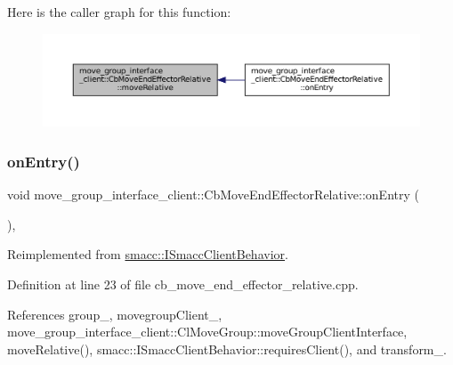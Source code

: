 Here is the caller graph for this function\+:
\nopagebreak
\begin{figure}[H]
\begin{center}
\leavevmode
\includegraphics[width=350pt]{classmove__group__interface__client_1_1CbMoveEndEffectorRelative_a8f64d14c4a398b455b1953ae61cc58bc_icgraph}
\end{center}
\end{figure}
\mbox{\label{classmove__group__interface__client_1_1CbMoveEndEffectorRelative_a54ba18388e200b43fda82a5f438d677e}} 
\subsubsection{\texorpdfstring{on\+Entry()}{onEntry()}}
{\footnotesize\ttfamily void move\+\_\+group\+\_\+interface\+\_\+client\+::\+Cb\+Move\+End\+Effector\+Relative\+::on\+Entry (\begin{DoxyParamCaption}{ }\end{DoxyParamCaption})\hspace{0.3cm}{\ttfamily [override]}, {\ttfamily [virtual]}}



Reimplemented from \hyperlink{classsmacc_1_1ISmaccClientBehavior_a3ec24a839087c550e1d62a81e48cf530}{smacc\+::\+I\+Smacc\+Client\+Behavior}.



Definition at line 23 of file cb\+\_\+move\+\_\+end\+\_\+effector\+\_\+relative.\+cpp.



References group\+\_\+, movegroup\+Client\+\_\+, move\+\_\+group\+\_\+interface\+\_\+client\+::\+Cl\+Move\+Group\+::move\+Group\+Client\+Interface, move\+Relative(), smacc\+::\+I\+Smacc\+Client\+Behavior\+::requires\+Client(), and transform\+\_\+.


